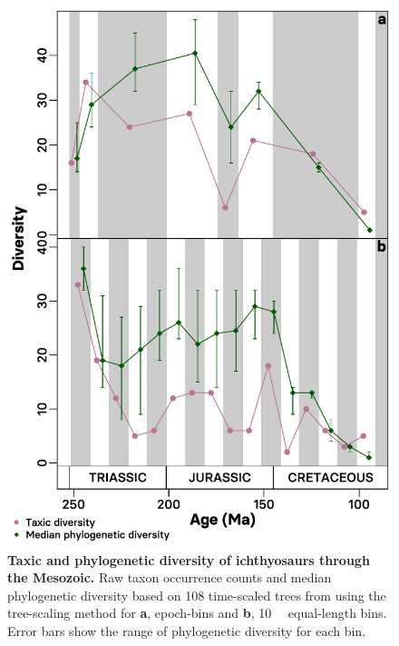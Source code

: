 \documentclass[british,a4paper]{article}
\begin{document}
\begin{figure}[h]
    \includegraphics[center]{supp_figures/figS1-hedman_diversity}
    \caption[Taxic and phylogenetic diversity of ichthyosaurs through the Mesozoic]{\textbf{Taxic and phylogenetic diversity of ichthyosaurs through the Mesozoic.} Raw taxon occurrence counts and median phylogenetic diversity based on 108 time-scaled trees from \textcite{Moon2019a} using the \textcite{Hedman2010} tree-scaling method for \textbf{a}, epoch-bins and \textbf{b}, \SI{10}{\mega\annum} equal-length bins. Error bars show the range of phylogenetic diversity for each bin.\label{fig:hedman-diversity}}
\end{figure}
\end{document}
